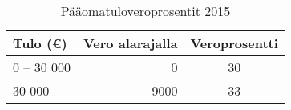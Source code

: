 \begin{table}[h]
    \centering
	\begin{tabular}{|lrc|}
        \hline
        Tulo (\euro)   & Vero alarajalla  & Veroprosentti \\
        \hline
        0 -- 30 000 & 0 &  30            \\
        30 000 --   & 9000 & 33   \\
        \hline
	\end{tabular}
	\caption*{Pääomatuloveroprosentit 2015}
\end{table}